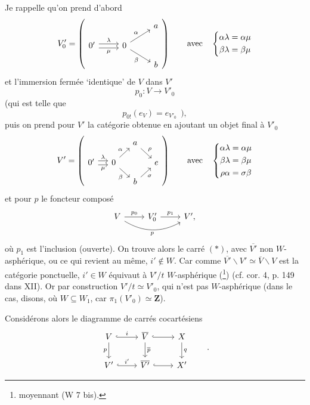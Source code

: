 \documentclass[11pt]{article}
\newcommand{\printedpage}[1]{\marginpar{\footnotesize p.~#1}}
\newcommand{\msp}[1]{\marginpar{\footnotesize [#1]}}
\begin{document}
Je rappelle qu'on prend d'abord
\printedpage{11}
\[
V'_0 = \left(
\begin{tikzcd}[row sep=small]
 & & a \\
0' \arrow[r, shift left, "\lambda"] \arrow[r, shift right, "\mu"'] & 0 \arrow[ur, "\alpha"] \arrow[dr, "\beta"'] & \\
 & & b
\end{tikzcd}
\right)
\qquad \text{avec} \quad
\left\{
\begin{aligned}
\alpha\lambda &= \alpha\mu \\
\beta\lambda &= \beta\mu
\end{aligned}
\right.
\]
et l'immersion fermée ‘identique’ de $V$ dans $V'$ 
\[ p_0 : V \longrightarrow V'_0 \]
\msp{page 15}(qui est telle que
\[ p_{0!}(e_V) = e_{V'_0} \ \ ), \]
puis on prend pour $V'$ la catégorie obtenue en ajoutant un objet final à $V'_0$
\[
V' = \left(
\begin{tikzcd}[row sep=small, column sep=small]
 & & a \arrow[dr, "\rho"] & \\
0' \arrow[r, shift left, "\lambda"] \arrow[r, shift right, "\mu"'] & 0 \arrow[ur, "\alpha"] \arrow[dr, "\beta"'] & & e \\
 & & b \arrow[ur, "\sigma"'] &
\end{tikzcd}
\right)
\qquad \text{avec} \quad
\left\{
\begin{aligned}
\alpha\lambda &= \alpha\mu \\
\beta\lambda &= \beta\mu \\
\rho\alpha &= \sigma\beta
\end{aligned}
\right.
\]
et pour $p$ le foncteur composé
\[
\begin{tikzcd}
V \arrow[r, "p_0"] \arrow[rr, bend right, "p"'] & V'_0 \arrow[r, "p_1"] & V',
\end{tikzcd}
\]
où $p_1$ est l'inclusion (ouverte). On trouve alors le carré $(*)$, avec $\overline{V'}$ non $W$-asphérique, ou ce qui revient au même, $i' \notin W$. Car comme $\overline{V'}\backslash V' \simeq \overline{V}\backslash V$ est la catégorie ponctuelle, $i' \in W$ équivaut à $V'/t$ $W$-asphérique (\footnote[8]{moyennant (W 7 bis).}) (cf. cor. 4, p. 149 dans XII). Or par construction $V'/t \simeq V'_0$, qui n'est pas $W$-asphérique (dans le cas, disons, où $W \subseteq W_1$, car $\pi_1(V'_0) \simeq \mathbf{Z}$).

\msp{page 16}Considérons alors le diagramme de carrés cocartésiens
\[
\begin{tikzcd}
V \arrow[r, hook, "i"] \arrow[d, "p"'] & \overline{V} \arrow[r, hook] \arrow[d, "\overline{p}"] & X \arrow[d, "q"] \\
V' \arrow[r, hook, "i'"] & \overline{V'} \arrow[r, hook] & X'
\end{tikzcd}
\qquad .
\]
\end{document}
